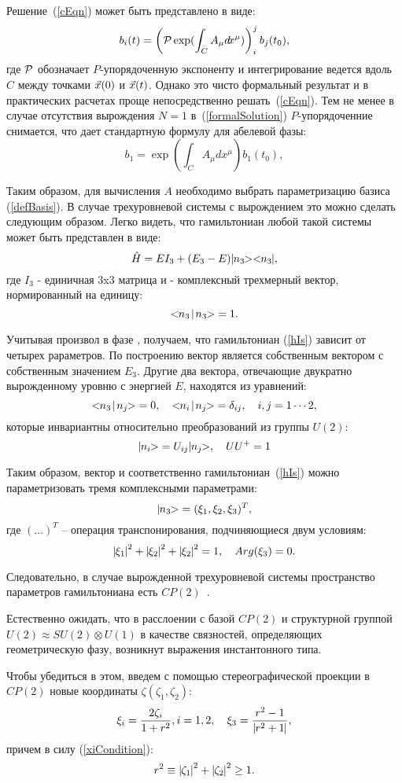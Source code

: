 \documentclass[a4paper]{article}
\def\MAP#1{\ifmmode{#1}\else{$#1$}\fi}
\def\abs#1{\MAP{\mid\!\!#1\!\!\mid}}
\def\ket#1{\MAP{\mid\!\!#1\!\!>}}
\def\bra#1{\MAP{<\!\!#1\!\!\mid}}
\def\dirProd#1#2{\MAP{<\!\! #1 \! \mid \! #2 \!\!>}}
\def\vct#1{\MAP{\vec #1}}
\def\be{\begin{equation} \nonumber}
\def\ee{\end{equation}}
\def\bel#1{\begin{equation}\label{#1}}
\def\rf#1{(\ref{#1})}
\def\H{\MAP{\hat H}}
\def\X{\MAP{\vct x}}
\begin{document}
Решение~\rf{cEqn} может быть представлено в виде:
\bel{formalSolution}
b_i(t) = \left({\cal P}\exp(\int_C A_\mu d\!x^\mu)\right)^j_i b_j(t_0),
\ee
где ${\cal P}$ обозначает $P$-упорядоченную экспоненту и интегрирование
ведется вдоль $C$ между точками $\X(0)$ и $\X(t)$. Однако это чисто
формальный результат и в практических расчетах проще непосредственно
решать~\rf{cEqn}. Тем не менее в случае отсутствия вырождения $N = 1$
в~\rf{formalSolution} $P$-упорядоченние снимается, что дает стандартную
формулу для абелевой фазы:
\be
b_1 = \exp(\int_C A_\mu d\!x^\mu)b_1(t_0),
\ee

Таким образом, для вычисления $A$ необходимо выбрать параметризацию
базиса \rf{defBasis}. В случае трехуровневой системы с вырождением
это можно сделать следующим образом. Легко видеть, что гамильтониан
любой такой системы может быть представлен в виде:
\bel{hIs}
\H = EI_3 + (E_3 - E)\ket{n_3}\bra{n_3},
\ee
где $I_3$ - единичная 3x3 матрица и \ket{n_3} - комплексный трехмерный вектор,
нормированный на единицу:
\[
\dirProd{n_3}{n_3} = 1.
\]

Учитывая произвол в фазе \ket{n_3}, получаем, что гамильтониан \rf{hIs}
зависит от четырех рараметров. По построению вектор является собственным
вектором \H с собственным значением $E_3$. Другие два вектора, отвечающие
двукратно вырожденному уровню с энергией $E$, находятся из уравнений:
\bel{nsEqn}
\dirProd{n_3}{n_j}  = 0, \quad \dirProd{n_i}{n_j} = \delta_{ij},
\quad i, j  = 1\cdots 2,
\ee
которые инвариантны относительно преобразований из группы $U(2)$:
\be
\ket{n_i} = U_{ij}\ket{n_j}, \quad UU^+ = 1
\ee

Таким образом, вектор \ket{n_3} и соответственно гамильтониан~\rf{hIs}
можно параметризовать тремя комплексными параметрами:
\be
\ket{n_3} = (\xi_1, \xi_2, \xi_3)^T,
\ee
где $(\dots)^T$ -- операция транспонирования,
подчиняющиеся двум условиям:
\bel{xiCondition}
\abs{\xi_1}^2 + \abs{\xi_2}^2 + \abs{\xi_2}^2 = 1, \quad Arg(\xi_3) = 0.
\ee

Следовательно, в случае вырожденной трехуровневой системы
пространство параметров гамильтониана есть $CP(2)$~\cite{AboutCpTwoSpace}.

Естественно ожидать, что в расслоении с базой $CP(2)$ и структурной группой
$U(2) \approx SU(2) \otimes U(1)$ в качестве связностей, определяющих
геометрическую фазу, возникнут выражения инстантонного типа.

Чтобы убедиться в этом, введем с помощью стереографической проекции
в $CP(2)$ новые координаты $\zeta(\zeta_1, \zeta_2)$:
\bel{stereoProject}
 \xi_i = \frac{2\zeta_i}{1 + r^2}, i = 1,2,
\quad \xi_3 = \frac{r^2 - 1}{\abs{r^2 + 1}},
\ee
причем в силу \rf{xiCondition}:
\bel{rCondition}
r^2 \equiv \abs{\zeta_1}^2 + \abs{\zeta_2}^2 \ge 1.
\ee
\end{document}
